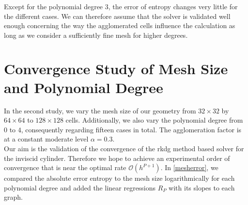 	Except for the polynomial degree $3$, the error of entropy changes very little for the different cases. We can therefore assume that the solver is validated well enough concerning the way the agglomerated cells influence the calculation as long as we consider a sufficiently fine mesh for higher degrees.
	
	\section{Convergence Study of Mesh Size and Polynomial Degree}
	
	In the second study, we vary the mesh size of our geometry from $32 \times 32$ by $64 \times 64$ to $128 \times 128$ cells. Additionally, we also vary the polynomial degree from $0$ to $4$, consequently regarding fifteen cases in total. The agglomeration factor is at a constant moderate level $\alpha = 0.3$.\\
	Our aim is the validation of the convergence of the \gls{rkdg} method based solver for the inviscid cylinder. Therefore we hope to achieve an experimental order of convergence that is near the optimal rate $\mathcal{O}(h^{P+1})$. In  \cref{mesherror}, we compared the absolute error entropy to the mesh size logarithmically for each polynomial degree and added the linear regressions $R_P$ with its slopes to each graph.

